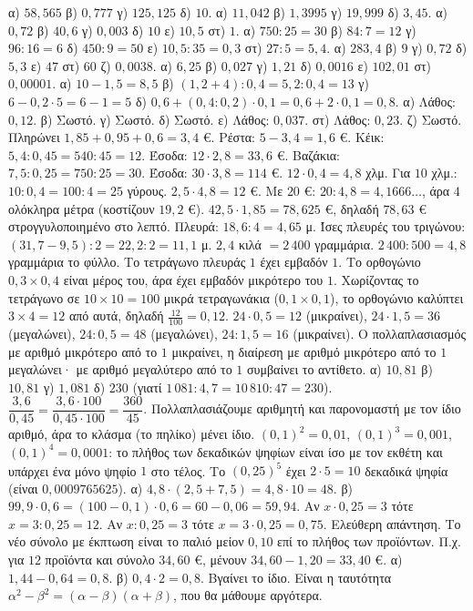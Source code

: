  α) $58{,}565$ \quad β) $0{,}777$ \quad γ) $125{,}125$ \quad δ) $10$.
 α) $11{,}042$ \quad β) $1{,}3995$ \quad γ) $19{,}999$ \quad δ) $3{,}45$.
 α) $0{,}72$ \quad β) $40{,}6$ \quad γ) $0{,}003$ \quad δ) $10$ \quad ε) $10{,}5$ \quad στ) $1$.
 α) $750:25=30$ \quad β) $84:7=12$ \quad γ) $96:16=6$ \quad δ) $450:9=50$ \quad ε) $10{,}5:35=0{,}3$ \quad στ) $27:5=5{,}4$.
 α) $283{,}4$ \quad β) $9$ \quad γ) $0{,}72$ \quad δ) $5{,}3$ \quad ε) $47$ \quad στ) $60$ \quad ζ) $0{,}0038$.
 α) $6{,}25$ \quad β) $0{,}027$ \quad γ) $1{,}21$ \quad δ) $0{,}0016$ \quad ε) $102{,}01$ \quad στ) $0{,}00001$.
 α) $10-1{,}5=8{,}5$ \quad β) $(1{,}2+4):0{,}4=5{,}2:0{,}4=13$ \quad γ) $6-0{,}2\cdot5=6-1=5$ \quad δ) $0{,}6+(0{,}4:0{,}2)\cdot0{,}1=0{,}6+2\cdot0{,}1=0{,}8$.
 α) Λάθος: $0{,}12$. β) Σωστό. γ) Σωστό. δ) Σωστό. ε) Λάθος: $0{,}037$. στ) Λάθος: $0{,}23$. ζ) Σωστό.
 Πληρώνει $1{,}85+0{,}95+0{,}6=3{,}4$ €. Ρέστα: $5-3{,}4=1{,}6$ €.
 Κέικ: $5{,}4:0{,}45=540:45=12$. Έσοδα: $12\cdot2{,}8=33{,}6$ €.
 Βαζάκια: $7{,}5:0{,}25=750:25=30$. Έσοδα: $30\cdot3{,}8=114$ €.
 $12\cdot0{,}4=4{,}8$ χλμ. Για $10$ χλμ.: $10:0{,}4=100:4=25$ γύρους.
 $2{,}5\cdot4{,}8=12$ €. Με $20$ €: $20:4{,}8=4{,}1666\ldots$, άρα $4$ ολόκληρα μέτρα (κοστίζουν $19{,}2$ €).
 $42{,}5\cdot1{,}85=78{,}625$ €, δηλαδή $78{,}63$ € στρογγυλοποιημένο στο λεπτό.
 Πλευρά: $18{,}6:4=4{,}65$ μ. Ίσες πλευρές του τριγώνου: $(31{,}7-9{,}5):2=22{,}2:2=11{,}1$ μ.
 $2{,}4$ κιλά $=2\,400$ γραμμάρια. $2\,400:500=4{,}8$ γραμμάρια το φύλλο.
 Το τετράγωνο πλευράς $1$ έχει εμβαδόν $1$. Το ορθογώνιο $0{,}3\times0{,}4$ είναι μέρος του, άρα έχει εμβαδόν μικρότερο του $1$. Χωρίζοντας το τετράγωνο σε $10\times10=100$ μικρά τετραγωνάκια ($0{,}1\times0{,}1$), το ορθογώνιο καλύπτει $3\times4=12$ από αυτά, δηλαδή $\frac{12}{100}=0{,}12$.
 $24\cdot0{,}5=12$ (μικραίνει), $24\cdot1{,}5=36$ (μεγαλώνει), $24:0{,}5=48$ (μεγαλώνει), $24:1{,}5=16$ (μικραίνει). Ο πολλαπλασιασμός με αριθμό μικρότερο από το $1$ μικραίνει, η διαίρεση με αριθμό μικρότερο από το $1$ μεγαλώνει· με αριθμό μεγαλύτερο από το $1$ συμβαίνει το αντίθετο.
 α) $10{,}81$ \quad β) $10{,}81$ \quad γ) $1{,}081$ \quad δ) $230$ (γιατί $1\,081:4{,}7=10\,810:47=230$).
 $\dfrac{3{,}6}{0{,}45}=\dfrac{3{,}6\cdot100}{0{,}45\cdot100}=\dfrac{360}{45}$. Πολλαπλασιάζουμε αριθμητή και παρονομαστή με τον ίδιο αριθμό, άρα το κλάσμα (το πηλίκο) μένει ίδιο.
 $(0{,}1)^2=0{,}01$, $(0{,}1)^3=0{,}001$, $(0{,}1)^4=0{,}0001$: το πλήθος των δεκαδικών ψηφίων είναι ίσο με τον εκθέτη και υπάρχει ένα μόνο ψηφίο $1$ στο τέλος. Το $(0{,}25)^5$ έχει $2\cdot5=10$ δεκαδικά ψηφία (είναι $0{,}0009765625$).
 α) $4{,}8\cdot(2{,}5+7{,}5)=4{,}8\cdot10=48$. β) $99{,}9\cdot0{,}6=(100-0{,}1)\cdot0{,}6=60-0{,}06=59{,}94$.
 Αν $x\cdot0{,}25=3$ τότε $x=3:0{,}25=12$. Αν $x:0{,}25=3$ τότε $x=3\cdot0{,}25=0{,}75$.
 Ελεύθερη απάντηση. Το νέο σύνολο με έκπτωση είναι το παλιό μείον $0{,}10$ επί το πλήθος των προϊόντων. Π.χ. για $12$ προϊόντα και σύνολο $34{,}60$ €, μένουν $34{,}60-1{,}20=33{,}40$ €.
 α) $1{,}44-0{,}64=0{,}8$. β) $0{,}4\cdot2=0{,}8$. Βγαίνει το ίδιο. Είναι η ταυτότητα $\alpha^2-\beta^2=(\alpha-\beta)(\alpha+\beta)$, που θα μάθουμε αργότερα.
